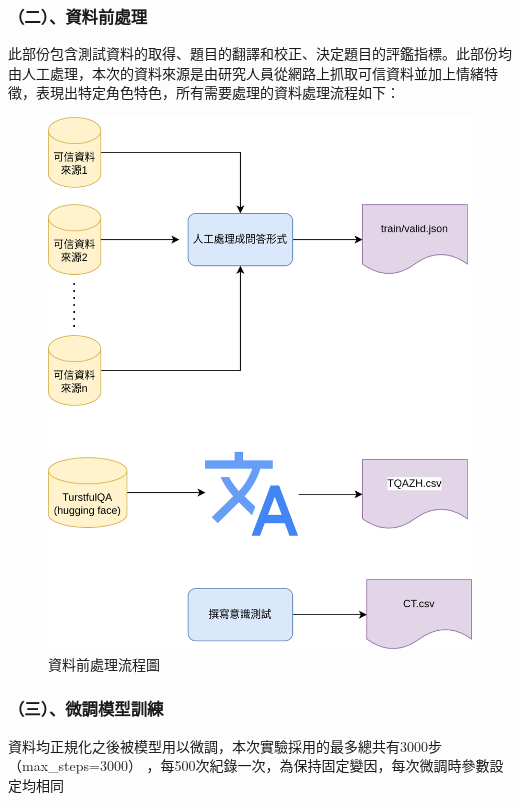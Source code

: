 \documentclass[12pt,a4paper,MingLiU,UTF8,natbib]{article}
\begin{document}
	\subsubsection{（二）、資料前處理}
	此部份包含測試資料的取得、題目的翻譯和校正、決定題目的評鑑指標。此部份均由人工處理，本次的資料來源是由研究人員從網路上抓取可信資料並加上情緒特徵，表現出特定角色特色，所有需要處理的資料處理流程如下：
	\begin{figure}[H]
		\centering
		\includegraphics[scale=0.3]{dataprocess}
		\caption{資料前處理流程圖}
	\end{figure}
	\subsubsection{（三）、微調模型訓練}
	資料均正規化之後被模型用以微調，本次實驗採用的最多總共有3000步（max\_steps=3000） ，每500次紀錄一次，為保持固定變因，每次微調時參數設定均相同
\end{document}
